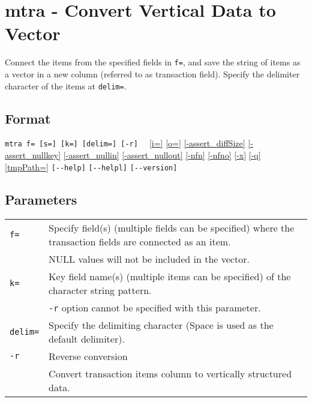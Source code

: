 
%

\section{mtra - Convert Vertical Data to Vector\label{sect:mtra}}
Connect the items from the specified fields in \verb|f=|,  and save the string of items as a vector in a new column (referred to as transaction field). 
Specify the delimiter character of the items at \verb|delim=|.


\subsection*{Format}
\verb|mtra f= [s=] [k=] [delim=] [-r]  | 
\hyperref[sect:option_i]{[i=]}
\hyperref[sect:option_o]{[o=]}
\hyperref[sect:option_assert_diffSize]{[-assert\_diffSize]}
\hyperref[sect:option_assert_nullkey]{[-assert\_nullkey]}
\hyperref[sect:option_assert_nullin]{[-assert\_nullin]}
\hyperref[sect:option_assert_nullout]{[-assert\_nullout]}
\hyperref[sect:option_nfn]{[-nfn]} 
\hyperref[sect:option_nfno]{[-nfno]}  
\hyperref[sect:option_x]{[-x]}
\hyperref[sect:option_q]{[-q]}
\hyperref[sect:option_option_tmppath]{[tmpPath=]}
\verb|[--help]|
\verb|[--helpl]|
\verb|[--version]|\\

\subsection*{Parameters}
\begin{table}[htbp]
{\small
\begin{tabular}{ll}
\verb|f=|        & Specify field(s) (multiple fields can be specified) where the transaction fields are connected as an item.\\
                 & NULL values will not be included in the vector.\\
\verb|k=|        &  Key field name(s) (multiple items can be specified) of the character string pattern. \\
                 & \verb|-r| option cannot be specified with this parameter. \\
\verb|delim=|    & Specify the delimiting character (Space is used as the default delimiter).\\
\verb|-r|        & Reverse conversion\\
                 & Convert transaction items column to vertically structured data.\\
\end{tabular} 
}
\end{table} 

